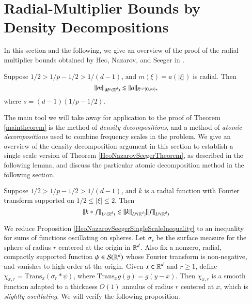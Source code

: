 \section{Radial-Multiplier Bounds by Density Decompositions} \label{sec:densitydecompositions}

In this section and the following, we give an overview of the proof of the radial multiplier bounds obtained by Heo, Nazarov, and Seeger in \cite{HeoandNazarovandSeeger}.

\begin{theorem} \label{HeoNazarovSeegerTheorem}
    Suppose $1/2 > 1/p - 1/2 > 1/(d-1)$, and $m(\xi) = a(|\xi|)$ is radial. Then
    \[ \| m \|_{M^p(\operatorname{\mathbb{R}}^d)} \lesssim \| a \|_{R^{s,p}[0,\infty)}, \]
    where $s = (d-1)(1/p - 1/2)$.
\end{theorem}

The main tool we will take away for application to the proof of Theorem \ref{maintheorem} is the method of \emph{density decompositions}, and a method of \emph{atomic decompositions} used to combine frequency scales in the problem. We give an overview of the density decomposition argument in this section to establish a single scale version of Theorem \ref{HeoNazarovSeegerTheorem}, as described in the following lemma, and discuss the particular atomic decomposition method in the following section.

\begin{prop} \label{HeoNazarovSeegerSingleScaleInequality}
  Suppose $1/2 > 1/p - 1/2 > 1/(d-1)$, and $k$ is a radial function with Fourier transform supported on $1/2 \leq |\xi| \leq 2$. Then
%
\[ \| k * f \|_{L^p(\operatorname{\mathbb{R}}^d)} \lesssim \| k \|_{L^p(\operatorname{\mathbb{R}}^d)} \| f \|_{L^p(\operatorname{\mathbb{R}}^d)} \]
%
\end{prop}

We reduce Proposition \ref{HeoNazarovSeegerSingleScaleInequality} to an inequality for sums of functions oscillating on spheres. Let $\sigma_r$ be the surface measure for the sphere of radius $r$ centered at the origin in $\operatorname{\mathbb{R}}^d$. Also fix a nonzero, radial, compactly supported function $\psi \in \mathcal{S}(\operatorname{\mathbb{R}}^d)$ whose Fourier transform is non-negative, and vanishes to high order at the origin. Given $x \in \operatorname{\mathbb{R}}^d$ and $r \geq 1$, define $\chi_{x, r} = \text{Trans}_x (\sigma_r * \psi)$, where $\text{Trans}_x g(y) = g(y - x)$. Then $\chi_{x,r}$ is a smooth function adapted to a thickness $O(1)$ annulus of radius $r$ centered at $x$, which is \emph{slightly oscillating}. We will verify the following proposition.

